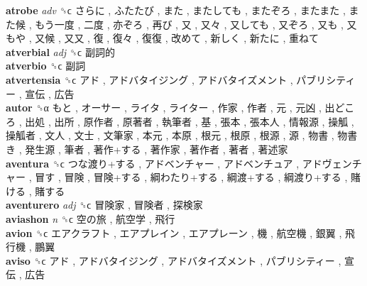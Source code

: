 \textbf{atrobe} \emph{adv}  ␝ϲ   さらに ,  ふたたび ,  また ,  またしても ,  またぞろ ,  またまた ,  また候 ,  もう一度 ,  二度 ,  亦ぞろ ,  再び ,  又 ,  又々 ,  又しても ,  又ぞろ ,  又も ,  又もや ,  又候 ,  又又 ,  復 ,  復々 ,  復復 ,  改めて ,  新しく ,  新たに ,  重ねて   \\
\textbf{atverbial} \emph{adj}  ␝ϲ   副詞的   \\
\textbf{atverbio} ␝ϲ   副詞   \\
\textbf{atvertensia} ␝ϲ   アド ,  アドバタイジング ,  アドバタイズメント ,  パブリシティー ,  宣伝 ,  広告   \\
\textbf{autor} ␝α   もと ,  オーサー ,  ライタ ,  ライター ,  作家 ,  作者 ,  元 ,  元凶 ,  出どころ ,  出処 ,  出所 ,  原作者 ,  原著者 ,  執筆者 ,  基 ,  張本 ,  張本人 ,  情報源 ,  操觚 ,  操觚者 ,  文人 ,  文士 ,  文筆家 ,  本元 ,  本原 ,  根元 ,  根原 ,  根源 ,  源 ,  物書 ,  物書き ,  発生源 ,  筆者 ,  著作+する ,  著作家 ,  著作者 ,  著者 ,  著述家   \\
\textbf{aventura} ␝ϲ   つな渡り+する ,  アドベンチャー ,  アドベンチュア ,  アドヴェンチャー ,  冒す ,  冒険 ,  冒険+する ,  綱わたり+する ,  綱渡+する ,  綱渡り+する ,  賭ける ,  賭する   \\
\textbf{aventurero} \emph{adj}  ␝ϲ   冒険家 ,  冒険者 ,  探検家   \\
\textbf{aviashon} \emph{n}  ␝ϲ   空の旅 ,  航空学 ,  飛行   \\
\textbf{avion} ␝ϲ   エアクラフト ,  エアプレイン ,  エアプレーン ,  機 ,  航空機 ,  銀翼 ,  飛行機 ,  鵬翼   \\
\textbf{aviso} ␝ϲ   アド ,  アドバタイジング ,  アドバタイズメント ,  パブリシティー ,  宣伝 ,  広告   \\
